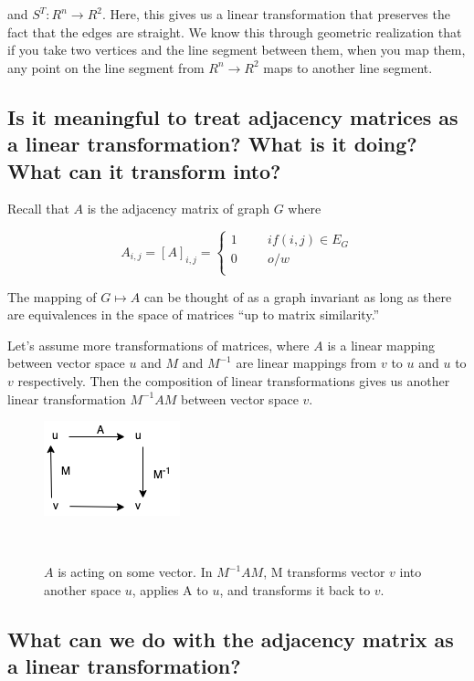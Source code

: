 \documentclass{article}
\begin{document}
    and $S^T: R^n \rightarrow R^2$. Here, this gives us a linear transformation that preserves the fact that the edges are straight. We know this through geometric realization that if you take two vertices and the line segment between them, when you map them, any point on the line segment from $R^n \rightarrow R^2$ maps to another line segment.

    \subsection{Is it meaningful to treat adjacency matrices as a linear transformation? What is it doing? What can it transform into?}
    
    Recall that $A$ is the adjacency matrix of graph $G$ where
    
    $$A_{i,j} = [A]_{i,j} =
        \left\{
            \begin{array}{ll}
                1\hspace{1cm} if(i,j) \in E_G\\
                0\hspace{1cm} o/w\\
            \end{array}
        \right.$$

The mapping of $G\longmapsto A$ can be thought of as a graph invariant as long as there are equivalences in the space of matrices ``up to matrix similarity.''

Let's assume more transformations of matrices, where $A$ is a linear mapping between vector space $u$ and $M$ and $M^{-1}$ are linear mappings from $v$ to $u$ and $u$ to $v$ respectively. Then the composition of linear transformations gives us another linear transformation $M^{-1}AM$ between vector space $v$.  

\begin{figure}[H]
\centering
  \includegraphics[width=0.2\columnwidth]{p1.png}
  \caption{$A$ is acting on some vector. In $M^{-1}AM$, M transforms vector $v$ into another space $u$, applies A to $u$, and transforms it back to $v$.   }~\label{fig:figure1}
\end{figure}

\subsection{What can we do with the adjacency matrix as a linear transformation?}
\end{document}
